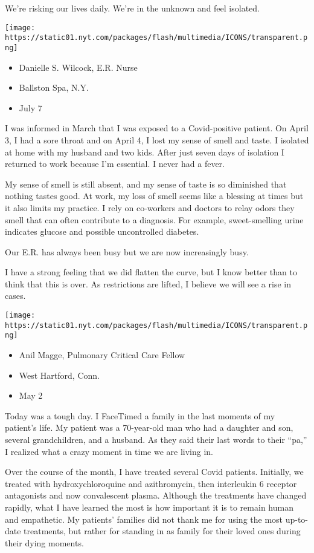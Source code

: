 We're risking our lives daily. We're in the unknown and feel isolated.

\texttt{[image: https://static01.nyt.com/packages/flash/multimedia/ICONS/transparent.png]}

\begin{itemize}
\tightlist
\item
  Danielle S. Wilcock, E.R. Nurse
\item
  Ballston Spa, N.Y.
\item
  July 7
\end{itemize}

I was informed in March that I was exposed to a Covid-positive patient.
On April 3, I had a sore throat and on April 4, I lost my sense of smell
and taste. I isolated at home with my husband and two kids. After just
seven days of isolation I returned to work because I'm essential. I
never had a fever.

My sense of smell is still absent, and my sense of taste is so
diminished that nothing tastes good. At work, my loss of smell seems
like a blessing at times but it also limits my practice. I rely on
co-workers and doctors to relay odors they smell that can often
contribute to a diagnosis. For example, sweet-smelling urine indicates
glucose and possible uncontrolled diabetes.

Our E.R. has always been busy but we are now increasingly busy.

I have a strong feeling that we did flatten the curve, but I know better
than to think that this is over. As restrictions are lifted, I believe
we will see a rise in cases.

\texttt{[image: https://static01.nyt.com/packages/flash/multimedia/ICONS/transparent.png]}

\begin{itemize}
\tightlist
\item
  Anil Magge, Pulmonary Critical Care Fellow
\item
  West Hartford, Conn.
\item
  May 2
\end{itemize}

Today was a tough day. I FaceTimed a family in the last moments of my
patient's life. My patient was a 70-year-old man who had a daughter and
son, several grandchildren, and a husband. As they said their last words
to their ``pa,'' I realized what a crazy moment in time we are living
in.

Over the course of the month, I have treated several Covid patients.
Initially, we treated with hydroxychloroquine and azithromycin, then
interleukin 6 receptor antagonists and now convalescent plasma. Although
the treatments have changed rapidly, what I have learned the most is how
important it is to remain human and empathetic. My patients' families
did not thank me for using the most up-to-date treatments, but rather
for standing in as family for their loved ones during their dying
moments.

